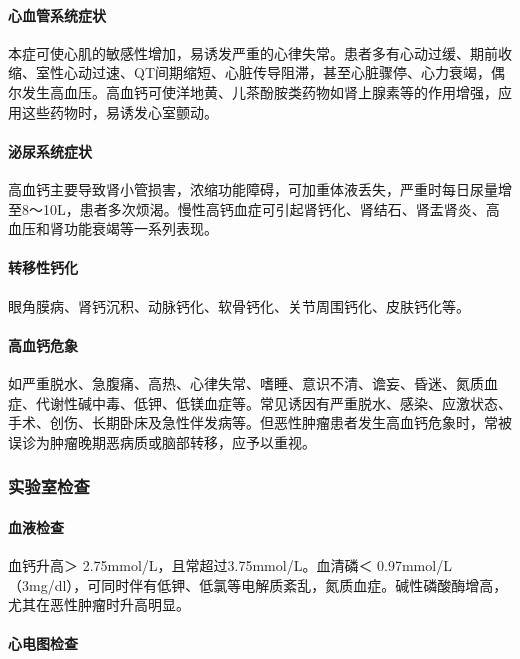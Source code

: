 \paragraph{心血管系统症状}

本症可使心肌的敏感性增加，易诱发严重的心律失常。患者多有心动过缓、期前收缩、室性心动过速、QT间期缩短、心脏传导阻滞，甚至心脏骤停、心力衰竭，偶尔发生高血压。高血钙可使洋地黄、儿茶酚胺类药物如肾上腺素等的作用增强，应用这些药物时，易诱发心室颤动。

\paragraph{泌尿系统症状}

高血钙主要导致肾小管损害，浓缩功能障碍，可加重体液丢失，严重时每日尿量增至8～10L，患者多次烦渴。慢性高钙血症可引起肾钙化、肾结石、肾盂肾炎、高血压和肾功能衰竭等一系列表现。

\paragraph{转移性钙化}

眼角膜病、肾钙沉积、动脉钙化、软骨钙化、关节周围钙化、皮肤钙化等。

\paragraph{高血钙危象}

如严重脱水、急腹痛、高热、心律失常、嗜睡、意识不清、谵妄、昏迷、氮质血症、代谢性碱中毒、低钾、低镁血症等。常见诱因有严重脱水、感染、应激状态、手术、创伤、长期卧床及急性伴发病等。但恶性肿瘤患者发生高血钙危象时，常被误诊为肿瘤晚期恶病质或脑部转移，应予以重视。

\subsubsection{实验室检查}

\paragraph{血液检查}

血钙升高＞ 2.75mmol/L，且常超过3.75mmol/L。血清磷＜
0.97mmol/L（3mg/dl），可同时伴有低钾、低氯等电解质紊乱，氮质血症。碱性磷酸酶增高，尤其在恶性肿瘤时升高明显。

\paragraph{心电图检查}

